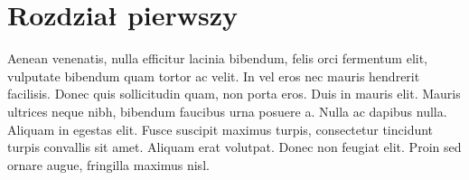 \documentclass[polish,engineering]{wizthesis}
\begin{document}
\mainmatter %

\chapter{Rozdział pierwszy}

Aenean venenatis, nulla efficitur lacinia bibendum, felis orci fermentum elit, vulputate bibendum quam tortor ac velit. In vel eros nec mauris hendrerit facilisis. Donec quis sollicitudin quam, non porta eros. Duis in mauris elit. Mauris ultrices neque nibh, bibendum faucibus urna posuere a. Nulla ac dapibus nulla. Aliquam in egestas elit. Fusce suscipit maximus turpis, consectetur tincidunt turpis convallis sit amet. Aliquam erat volutpat. Donec non feugiat elit. Proin sed ornare augue, fringilla maximus nisl.
\end{document}
